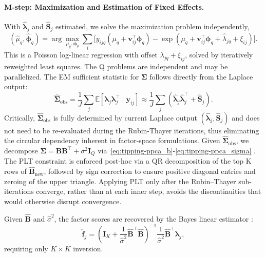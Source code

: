 \paragraph*{M-step: Maximization and Estimation of Fixed Effects.}
With $\hat{\bm{\lambda}}_{j}$ and $\hat{\mathbf{S}}_{j}$ estimated, we solve the maximization problem independently, 
\begin{equation}
    (\hat{\mu}_{q}, \hat{\bm{\phi}}_{q})=\arg \max_{\mu_{q}, \bm{\phi}_{q}}\sum_{i}\bigl[y_{ijq}(\mu_{q}+\bm{v}_{ij}^{\top}\bm{\phi}_{q})-\exp (\mu_{q}+\bm{v}_{ij}^{\top}\bm{\phi}_{q}+\hat{\lambda}_{jq}+\xi_{ij})\bigr].
\end{equation}
This is a Poisson log-linear regression with offset $\lambda_{jq}+\xi_{ij}$, solved by iteratively reweighted least squares. The Q problems are independent and may be parallelized. The EM sufficient statistic for $\bm{\Sigma}$ follows directly from the Laplace output:
\begin{equation}
    \hat{\bm{\Sigma}}_{\text{obs}}=\frac{1}{J}\sum_{j}\mathbb{E}[\bm{\lambda}_{j} \bm{\lambda}_{j}^{\top}\mid \bm{y}_{ij}]\approx \frac{1}{J}\sum_{j}(\hat{\bm{\lambda}}_{j} \hat{\bm{\lambda}}_{j}^{\top}+\hat{\mathbf{S}}_{j}).
    \label{eq:sigma-obs}
\end{equation}
Critically, $\hat{\bm{\Sigma}}_{\text{obs}}$ is fully determined by current Laplace output $(\hat{\bm{\lambda}}_{j}, \hat{\mathbf{S}}_{j})$ and does not need to be re-evaluated during the Rubin-Thayer iterations, thus eliminating the circular dependency inherent in factor-space formulations.
Given $\hat{\bm{\Sigma}}_{\text{obs}}$, we decompose $\bm{\Sigma}=\mathbf{BB}^{\top}+\sigma^2\mathbf{I}_{Q}$ via~\ref{eq:tipping-ppca_b}-\ref{eq:tipping-ppca_sigma} \citep{Tipping1999}. The PLT constraint is enforced post-hoc via a QR decomposition of the top K rows of $\hat{\mathbf{B}}_{\text{new}}$, followed by sign correction to ensure positive diagonal entries and zeroing of the upper triangle. Applying PLT only after the Rubin–Thayer sub-iterations converge, rather than at each inner step, avoids the discontinuities that would otherwise disrupt convergence.

Given $\hat{\mathbf{B}}$ and $\hat{\sigma}^2$, the factor scores are recovered by the Bayes linear estimator \citep{Gelman2013}:
\begin{equation}
\hat{\mathbf{f}}_j = \left( \mathbf{I}_K + \frac{1}{\hat{\sigma}^2} \hat{\mathbf{B}}^\top \hat{\mathbf{B}} \right)^{-1} \frac{1}{\hat{\sigma}^2} \hat{\mathbf{B}}^\top \hat{\boldsymbol{\lambda}}_j ,
\label{eq: Bayeslinearestimator}
\end{equation}
requiring only $K\times K$ inversion.

